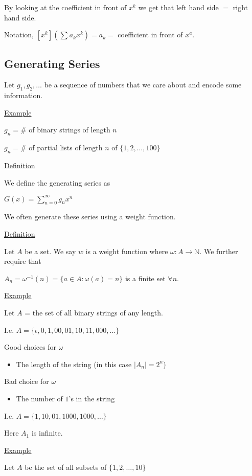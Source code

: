 \documentclass{article}
\begin{document}
By looking at the coefficient in front of $x^k$ we get that left hand side $=$ right hand side. 

Notation, $[x^k](\sum_{}^{}a_kx^k) = a_k =$ coefficient in front of $ x^a$.

\subsection{Generating Series}

Let $g_1, g_2, \ldots$ be a sequence of numbers that we care about and encode some information. 

\underline{Example}

$g_n = \#$ of binary strings of length $n$

$g_n = \#$ of partial lists of length $n$ of $\{1,2,\ldots,100\}$

\underline{Definition}

We define the generating series as

$G(x) = \sum_{n=0}^{\infty}g_nx^n$

We often generate these series using a weight function.

\underline{Definition}

Let $A$ be a set. We say $w$ is a weight function where $\omega: A \to \mathbb{N}$. We further require that 

$A_n = \omega^{-1}(n) = \{a \in A: \omega(a) = n\}$ is a finite set $\forall n$.

\underline{Example}

Let $A$ = the set of all binary strings of any length. 

I.e. $A = \{\epsilon, 0, 1, 00, 01, 10, 11, 000, \ldots \}$

Good choices for $\omega$
\begin{itemize}
    \item The length of the string (in this case $|A_n| = 2^n$)
\end{itemize}

Bad choice for $\omega$
\begin{itemize}
    \item The number of $1$'s in the string
\end{itemize}

I.e. $A = \{1,10,01,1000,1000,\ldots\}$

Here $A_1$ is infinite.

\underline{Example}

Let $A$ be the set of all subsets of $\{1,2,\ldots,10\}$
\end{document}

